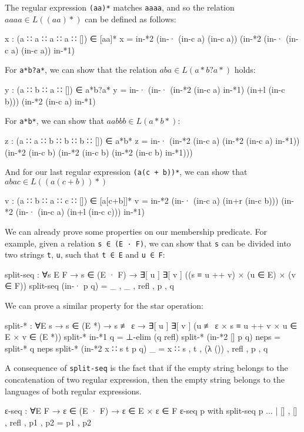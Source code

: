 The regular expression \texttt{(aa)*} matches \texttt{aaaa}, and so the relation $aaaa \in L((aa)*)$ can be defined as follows:
\begin{agda}
x : (a ∷ a ∷ a ∷ a ∷ []) ∈ [aa]*
x = in-*2 (in-· (in-c a) (in-c a))
        (in-*2 (in-· (in-c a) (in-c a)) in-*1)
\end{agda}
For \texttt{a*b?a*}, we can show that the relation $aba \in L(a*b?a*)$ holds:
\begin{agda}
y : (a ∷ b ∷ a ∷ []) ∈ a*b?a*
y = in-· (in-· (in-*2 (in-c a) in-*1)
               (in+l (in-c b)))
         (in-*2 (in-c a) in-*1)
\end{agda}
For \texttt{a*b*}, we can show that $aabbb \in L(a*b*)$:
\begin{agda}
z : (a ∷ a ∷ b ∷ b ∷ b ∷ []) ∈ a*b*
z = in-· (in-*2 (in-c a)
            (in-*2 (in-c a) in-*1))
         (in-*2 (in-c b)
            (in-*2 (in-c b)
              (in-*2 (in-c b) in-*1)))
\end{agda}
And for our last regular expression \texttt{(a(c + b))*}, we can show that $abac \in L((a(c + b))*)$
\begin{agda}
v : (a ∷ b ∷ a ∷ c ∷ []) ∈ [a[c+b]]*
v = in-*2 (in-· (in-c a) (in+r (in-c b)))
          (in-*2 
            (in-· (in-c a) (in+l (in-c c))) in-*1)
\end{agda}
We can already prove some properties on our membership predicate. For example, given a relation \texttt{s ∈ (E · F)}, we can show that \texttt{s} can be divided into two strings \texttt{t}, \texttt{u}, such that \texttt{t ∈ E} and \texttt{u ∈ F}:
\begin{agda}
split-seq : ∀{s E F}
  → s ∈ (E · F)
  → ∃[ u ] ∃[ v ] ((s ≡ u ++ v) × (u ∈ E) × (v ∈ F))
split-seq (in-· p q) = _ , _ , refl , p , q
\end{agda}
We can prove a similar property for the star operation:
\begin{agda}
split-* : ∀{E s}
  → s ∈ (E *)
  → s ≢ ε
  → ∃[ u ] ∃[ v ] (u ≢ ε × s ≡ u ++ v × u ∈ E × v ∈ (E *))
split-* in-*1 q = ⊥-elim (q refl)
split-* (in-*2 {[]} p q) neps = split-* q neps
split-* (in-*2 {x ∷ s} {t} p q) _ = x ∷ s , t , (λ ()) , refl , p , q
\end{agda}
A consequence of \texttt{split-seq} is the fact that if the empty string belongs to the concatenation of two regular expression, then the empty string belongs to the languages of both regular expressions. 
\begin{agda}
ε-seq : ∀{E F} → ε ∈ (E · F) → ε ∈ E × ε ∈ F
ε-seq p with split-seq p
... | [] , [] , refl , p1 , p2 = p1 , p2
\end{agda}

